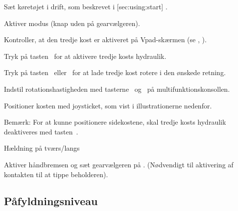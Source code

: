 \startSteps
\item Sæt køretøjet i drift, som beskrevet i [sec:using:start] .
\item Aktiver modus (knap uden på gearvælgeren).
\stopSteps


\startSteps [continue]
\item Kontroller, at den tredje kost er aktiveret på Vpad-skærmen (se  , ).
\item Tryk på tasten~ for at aktivere tredje kosts hydraulik.
\item Tryk på tasten~ eller~ for at lade tredje kost rotere i den ønskede retning.

\item Indstil rotationshastigheden med tasterne~ og~ på multifunktionskonsollen.

\item Positioner kosten med joysticket, som vist i illustrationerne nedenfor.

\stopSteps

{\md Bemærk:} {\lt For at kunne positionere sidekostene, skal tredje kosts hydraulik deaktiveres med tasten~.}
\vfill

\start
\setupcombinations [width=\textwidth]

{
{}{Hældning på tværs/langs}
\stopcombination}
\stop



\stopsection



\item Aktiver håndbremsen og sæt gearvælgeren på . (Nødvendigt til aktivering af kontakten til at tippe beholderen).



\subsection[niveau_hydrau]{Påfyldningsniveau}

